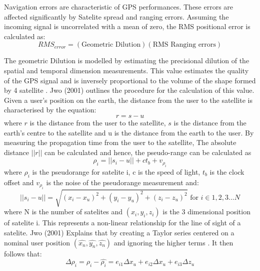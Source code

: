 Navigation errors are characteristic of GPS performances. These errors are affected significantly by Satelite spread and ranging errors. Assuming the incoming signal is uncorrelated with a mean of zero, the RMS positional error is calculated as:
\begin{equation}
    RMS_{error} = (\text{Geometric Dilution})(\text{RMS Ranging errors})
\end{equation}

The geometric Dilution is modelled by estimating the precisional dilution of the spatial and temporal dimension measurements. This value estimates the quality of the GPS signal and is inversely proportional to the volume of the shape formed by 4 satellite \cite{jwo2001efficient}. Jwo (2001) outlines the procedure for the calculation of this value. Given a user's position on the earth, the distance from the user to the satellite is characterised by the equation:
\begin{equation}
    r =  s - u
\end{equation}
where $r$ is the distance from the user to the satellite, $s$ is the distance from the earth's centre to the satellite and u is the distance from the earth to the user. By measuring the propagation time from the user to the satellite, The absolute distance $||r||$ can be calculated and hence, the pseudo-range can be calculated as
\begin{equation}
    \rho_i = ||s_i-u||+ct_b + v_{\rho_i}
\end{equation}
where $\rho_i$ is the pseudorange for satelite i, c is the speed of light, $t_b$ is  the clock offset and $v_{\rho_i}$ is the noise of the pseudorange measurement and:
\begin{equation}
    ||s_i-u|| = \sqrt{(x_i - x_u)^2+(y_i-y_u)^2+(z_i-z_u)^2} \text{ for } i \in 1,2,3...N \label{los}
\end{equation}
where N is the number of satelites and $(x_i,y_i,z_i)$ is the 3 dimensional position of satelite i. This represents a non-linear relationship for the line of sight of a satelite.  Jwo (2001) Explains that by creating a Taylor series centered on a nominal user position $(\hat{x_n},\hat{y_n},\hat{z_n})$ and ignoring the higher terms \cite{jwo2001efficient}. It then follows that:
\begin{equation}
    \Delta\rho_i = \rho_i - \hat{\rho_i} = e_{i1}\Delta x_u + e_{i2}\Delta x_u +  e_{i3}\Delta z_u
\end{equation}

